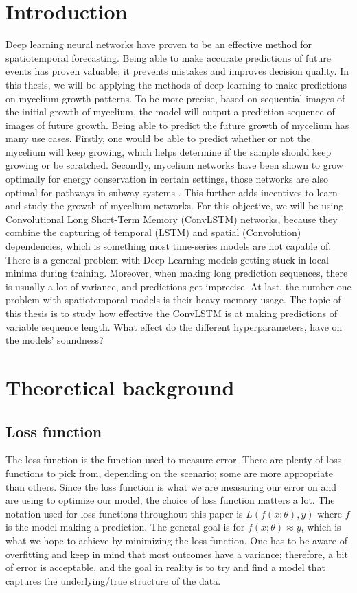 \documentclass[a4paper,12pt]{article}
\begin{document}
\section{Introduction}
Deep learning neural networks have proven to be an effective method for spatiotemporal forecasting. Being able to make accurate predictions of future events has proven valuable; it prevents mistakes and improves decision quality. In this thesis, we will be applying the methods of deep learning to make predictions on mycelium growth patterns.
To be more precise, based on sequential images of the initial growth of mycelium, the model will output a prediction sequence of images of future growth. Being able to predict the future growth of mycelium has many use cases. Firstly, one would be able to predict whether or not the mycelium will keep growing, which helps determine if the sample should keep growing or be scratched. Secondly, mycelium networks have been shown to grow optimally for energy conservation in certain settings, those networks are also optimal for pathways in subway systems \cite{joseph2022slime}.
This further adds incentives to learn and study the growth of mycelium networks. For this objective, we will be using Convolutional Long Short-Term Memory (ConvLSTM) networks, because they combine the capturing of temporal (LSTM) and spatial (Convolution) dependencies, which is something most time-series models are not capable of. There is a general problem with Deep Learning models getting stuck in local minima during training. Moreover, when making long prediction sequences, there is usually a lot of variance, and predictions get imprecise. At last, the number one problem with spatiotemporal models is their heavy memory usage.
The topic of this thesis is to study how effective the ConvLSTM is at making predictions of variable sequence length. What effect do the different hyperparameters, have on the models' soundness?

\section{Theoretical background}


\subsection{Loss function}
The loss function is the function used to measure error. There are plenty of loss functions to pick from, depending on the scenario; some are more appropriate than others.
Since the loss function is what we are measuring our error on and are using to optimize our model, the choice of loss function matters a lot. The notation used for loss functions throughout this paper is $L(f(x; \theta), y)$ where $f$ is the model making a prediction. The general goal is for $f(x; \theta) \approx y$, which is what we hope to achieve by minimizing the loss function.
One has to be aware of overfitting and keep in mind that most outcomes have a variance; therefore, a bit of error is acceptable, and the goal in reality is to try and find a model that captures the underlying/true structure of the data.
\end{document}
